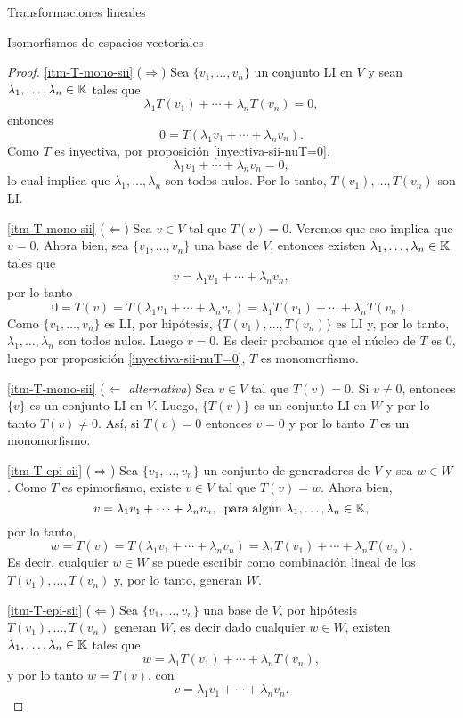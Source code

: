 \begin{chapter}{Transformaciones lineales}
\begin{section}{Isomorfismos de espacios vectoriales}
\begin{proof}
            
            \ref{itm-T-mono-sii} ($\Rightarrow$) Sea $\{v_1,\ldots,v_n \}$ un conjunto LI en $V$ y sean  $\lambda_1,\ldots,\lambda_n \in \mathbb K$ tales que
            $$
            \lambda_1T(v_1) +\cdots+ \lambda_{n}T(v_n) =0,
            $$
            entonces
            $$
            0 = T(\lambda_1v_1+\cdots + \lambda_{n}v_n).
            $$
            Como $T$  es inyectiva, por proposición \ref{inyectiva-sii-nuT=0}, 
            $$
            \lambda_1v_1+\cdots + \lambda_{n}v_n =0,
            $$
            lo cual implica que $\lambda_1,\ldots,\lambda_n$ son todos nulos. Por lo tanto,  $T(v_1),\ldots,T(v_n)$ son LI.
            
            
           \ref{itm-T-mono-sii} ($\Leftarrow$) Sea $v \in V$ tal que $T(v)=0$. Veremos que eso implica que $v =0$.  Ahora bien, sea  $\{v_1,\ldots,v_n \}$ una base de $V$,  entonces existen $\lambda_1,\ldots,\lambda_n \in \mathbb K$ tales que
            $$
            v = \lambda_1v_1+\cdots + \lambda_{n}v_n,
            $$
            por lo tanto
            $$
            0 = T(v) = T(\lambda_1v_1+\cdots + \lambda_{n}v_n) = \lambda_1T(v_1) +\cdots+ \lambda_{n}T(v_n).
            $$
            Como $\{v_1,\ldots,v_n \}$ es LI, por hipótesis, $\{T(v_1),\ldots,T(v_n)\}$ es LI y, por lo tanto, $\lambda_1,\ldots,\lambda_n$ son todos nulos. Luego $v=0$. Es decir probamos  que el núcleo de $T$ es 0, luego por proposición \ref{inyectiva-sii-nuT=0}, $T$ es monomorfismo. 

        \ref{itm-T-mono-sii} ($\Leftarrow$ \textit{alternativa}) Sea $v \in V$ tal que $T(v)=0$.	Si $v\neq 0$, entonces $\{v\}$ es un conjunto LI en $V$. Luego, $\{T(v)\}$ es un conjunto LI en $W$ y por lo tanto $T(v)\neq 0$. Así, si $T(v)=0$ entonces $v=0$ y por lo tanto $T$ es un monomorfismo.
              
            \ref{itm-T-epi-sii} ($\Rightarrow$) Sea   $\{v_1,\ldots,v_n \}$ un conjunto de generadores de $V$ y sea  $w \in W$. Como $T$  es epimorfismo, existe $v \in V$ tal que $T(v)=w$. Ahora bien, 
            $$
            v = \lambda_1v_1+\cdots + \lambda_{n}v_n,\, \text{ para algún $\lambda_1,\ldots,\lambda_n \in \mathbb K$,}
            $$
            por lo tanto,
            $$
            w =T(v) = T(\lambda_1v_1+\cdots + \lambda_{n}v_n) = \lambda_1T(v_1) +\cdots+ \lambda_{n}T(v_n).
            $$ 
            Es decir,  cualquier $w \in W$ se puede escribir como combinación lineal de los  $T(v_1),\ldots,T(v_n)$ y, por lo tanto,  generan $W$.
            
             \ref{itm-T-epi-sii} ($\Leftarrow$) Sea $\{v_1,\ldots,v_n \}$ una base de $V$, por hipótesis $T(v_1),\ldots,T(v_n)$ generan $W$,  es decir dado cualquier $w \in W$,   existen $\lambda_1,\ldots,\lambda_n \in \mathbb K$ tales que
            $$
            w = \lambda_1T(v_1)+\cdots + \lambda_{n}T(v_n),
            $$
            y por lo tanto $w = T(v)$,  con 
            $$
            v = \lambda_1v_1+\cdots + \lambda_{n}v_n.
            $$
        \end{proof}
        

\end{section}
\end{chapter}
